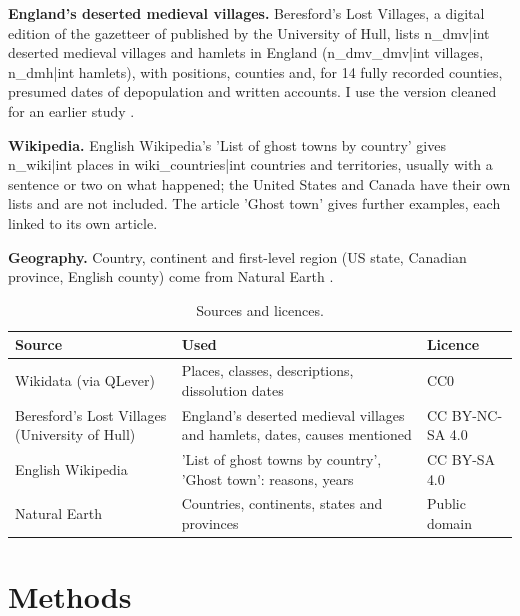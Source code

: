 \documentclass[11pt,a4paper]{article}
\begin{document}
\textbf{England's deserted medieval villages.} Beresford's Lost Villages, a digital edition of the gazetteer of \citet{beresfordhurst1971} published by the University of Hull, lists {{n_dmv|int}} deserted medieval villages and hamlets in England ({{n_dmv_dmv|int}} villages, {{n_dmh|int}} hamlets), with positions, counties and, for 14 fully recorded counties, presumed dates of depopulation and written accounts. I use the version cleaned for an earlier study \citep{hotham2026lv}.

\textbf{Wikipedia.} English Wikipedia's 'List of ghost towns by country' \citep{wikilist} gives {{n_wiki|int}} places in {{wiki_countries|int}} countries and territories, usually with a sentence or two on what happened; the United States and Canada have their own lists and are not included. The article 'Ghost town' \citep{wikighost} gives further examples, each linked to its own article.

\textbf{Geography.} Country, continent and first-level region (US state, Canadian province, English county) come from Natural Earth \citep{naturalearth}.

\begin{table}[tbp]\centering\small\caption{Sources and licences.}\label{tab:sources}
\begin{tabular}{>{\raggedright\arraybackslash}p{4.4cm}>{\raggedright\arraybackslash}p{6.8cm}>{\raggedright\arraybackslash}p{3.2cm}}\toprule Source & Used & Licence\\\midrule
Wikidata (via QLever) & Places, classes, descriptions, dissolution dates & CC0\\
Beresford's Lost Villages (University of Hull) & England's deserted medieval villages and hamlets, dates, causes mentioned & CC BY-NC-SA 4.0\\
English Wikipedia & 'List of ghost towns by country', 'Ghost town': reasons, years & CC BY-SA 4.0\\
Natural Earth & Countries, continents, states and provinces & Public domain\\
\bottomrule\end{tabular}\end{table}

\section{Methods}\label{sec:methods}
\end{document}
